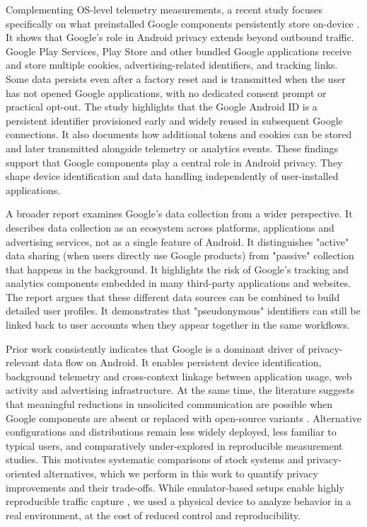 \documentclass[runningheads]{llncs}
\begin{document}
Complementing OS-level telemetry measurements, a recent study focuses specifically on what preinstalled Google components persistently store on-device \cite{cookies-identifiers2025}. It shows that Google’s role in Android privacy extends beyond outbound traffic. Google Play Services, Play Store and other bundled Google applications receive and store multiple cookies, advertising-related identifiers, and tracking links. Some data persists even after a factory reset and is transmitted when the user has not opened Google applications, with no dedicated consent prompt or practical opt-out. The study highlights that the Google Android ID is a persistent identifier provisioned early and widely reused in subsequent Google connections. It also documents how additional tokens and cookies can be stored and later transmitted alongside telemetry or analytics events. These findings support that Google components play a central role in Android privacy. They shape device identification and data handling independently of user-installed applications.

A broader report \cite{google-data-collection2018} examines Google's data collection from a wider perspective. It describes data collection as an ecosystem across platforms, applications and advertising services, not as a single feature of Android. It distinguishes "active" data sharing (when users directly use Google products) from "passive" collection that happens in the background. It highlights the risk of Google's tracking and analytics components embedded in many third-party applications and websites. The report argues that these different data sources can be combined to build detailed user profiles. It demonstrates that "pseudonymous" identifiers can still be linked back to user accounts when they appear together in the same workflows.

Prior work consistently indicates that Google is a dominant driver of privacy-relevant data flow on Android. It enables persistent device identification, background telemetry and cross-context linkage between application usage, web activity and advertising infrastructure. At the same time, the literature suggests that meaningful reductions in unsolicited communication are possible when Google components are absent or replaced with open-source variants \cite{android-os-snooping2021}. Alternative configurations and distributions remain less widely deployed, less familiar to typical users, and comparatively under-explored in reproducible measurement studies. This motivates systematic comparisons of stock systems and privacy-oriented alternatives, which we perform in this work to quantify privacy improvements and their trade-offs. While emulator-based setups enable highly reproducible traffic capture \cite{parrot2025}, we used a physical device to analyze behavior in a real environment, at the cost of reduced control and reproducibility.
\end{document}
